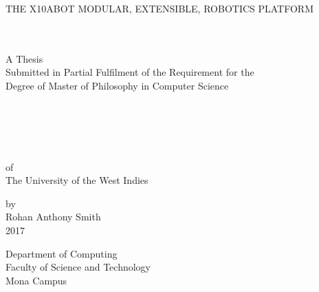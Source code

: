 \documentclass[a4paper, 12pt, oneside]{Thesis}
\begin{document}
\newcommand{\xten}{\texttt{X10ABOT }}
\newcommand{\reg}{\textsuperscript{\textregistered}}
\newcommand{\lego}{LEGO\reg }
\newcommand{\iic}{I$^2$C }
\newcommand{\includecode}[1]{\inputminted[linenos=true,breaklines=true,baselinestretch=1,frame=lines,framesep=2mm,label=\url{#1}]{c}{#1}}


\pagestyle{fancy}
\frontmatter

\begin{titlepage}
\singlespacing
\begin{center}

{\uppercase{The X10ABOT Modular, Extensible, Robotics Platform}}
\mbox{ }\\ 
\mbox{ }\\ 
\mbox{ }\\ 
\begin{center}
A Thesis\\ 
Submitted in Partial Fulfilment of the Requirement for the \\
Degree of Master of Philosophy in Computer Science\\
\mbox{ }\\ 
\mbox{ }\\ 
\mbox{ }\\ 
\mbox{ }\\ 
\mbox{ }\\ 
of\\
The University of the West Indies\\
\end{center}
\vfill
by\\
Rohan Anthony Smith\\
2017\\
\end{center}
Department of Computing\\
Faculty of Science and Technology\\
Mona Campus

\end{titlepage}
\end{document}
